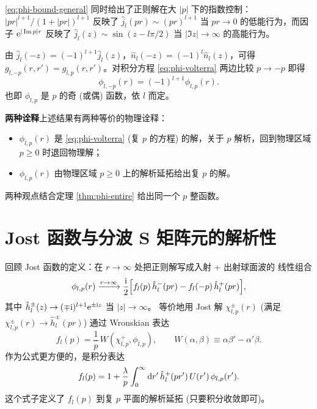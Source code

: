 \eqref{eq:phi-bound-general} 同时给出了正则解在大 $|p|$ 下的指数控制：
$|pr|^{l+1}/(1+|pr|)^{l+1}$ 反映了 $\hat j_l(pr)\sim (pr)^{l+1}$ 当 $pr\to 0$
的低能行为，而因子 $\mathrm{e}^{|\Im p|r}$ 反映了 $\hat j_l(z)\sim\sin(z-l\pi/2)$
当 $|\Im z|\to\infty$ 的高能行为。

\begin{remark}[$p\to-p$ 的对称性]\label{rem:phi-parity}
由 $\hat j_l(-z)=(-1)^{l+1}\hat j_l(z)$，$\hat n_l(-z)=(-1)^l\hat n_l(z)$，可得
$g_{l,-p}(r,r')=g_{l,p}(r,r')$。对积分方程 \eqref{eq:phi-volterra} 两边比较
$p\to -p$ 即得
\begin{equation}
\phi_{l,-p}(r)=(-1)^{l+1}\phi_{l,p}(r).
\label{eq:phi-parity}
\end{equation}
也即 $\phi_{l,p}$ 是 $p$ 的奇 (或偶) 函数，依 $l$ 而定。
\end{remark}

\textbf{两种诠释}\quad 上述结果有两种等价的物理诠释：
\begin{itemize}
\item $\phi_{l,p}(r)$ 是 \eqref{eq:phi-volterra} (复 $p$ 的方程) 的解，关于 $p$
解析，回到物理区域 $p\geq 0$ 时退回物理解；
\item $\phi_{l,p}(r)$ 由物理区域 $p\geq 0$ 上的解析延拓给出复 $p$ 的解。
\end{itemize}
两种观点结合定理 \ref{thm:phi-entire} 给出同一个 $p$ 整函数。

\section{Jost 函数与分波 S 矩阵元的解析性}\label{sec:jost-analytic}

回顾 Jost 函数的定义：在 $r\to\infty$ 处把正则解写成入射 + 出射球面波的
线性组合
\begin{equation}
\phi_{l,p}(r)\xrightarrow{r\to\infty}
\frac{\mathrm{i}}{2}\Bigl[f_l(p)\,\hat h^-_l(pr)-f_l(-p)\,\hat h^+_l(pr)\Bigr],
\label{eq:phi-asymp}
\end{equation}
其中 $\hat h^\pm_l(z)\to (\mp\mathrm{i})^{l+1}\mathrm{e}^{\pm\mathrm{i} z}$ 当 $|z|\to\infty$。
等价地用 Jost 解 $\chi^\pm_{l,p}(r)$ (满足 $\chi^\pm_{l,p}(r)\to\hat h^\pm_l(pr)$)
通过 Wronskian 表达
\begin{equation}
f_l(p)=\frac{1}{p}\,W(\chi^+_{l,p},\phi_{l,p}),\qquad
W(\alpha,\beta)\equiv \alpha\beta'-\alpha'\beta.
\label{eq:fW}
\end{equation}
作为公式更方便的，是积分表达
\begin{equation}
f_l(p)=1+\frac{\lambda}{p}\int_0^\infty \mathrm{d} r'\,\hat h^+_l(pr')\,U(r')\,\phi_{l,p}(r').
\label{eq:fl-int-ch11}
\end{equation}
这个式子定义了 $f_l(p)$ 到复 $p$ 平面的解析延拓 (只要积分收敛即可)。

